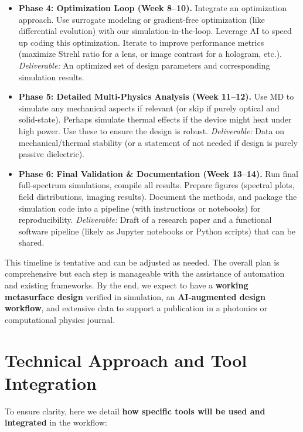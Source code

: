 \documentclass[11pt]{article}
\begin{document}
\begin{itemize}
\begin{itemize}[leftmargin=2em]
    \item \textbf{Phase 4: Optimization Loop (Week 8--10).} Integrate an optimization approach. Use surrogate modeling or gradient-free optimization (like differential evolution) with our simulation-in-the-loop. Leverage AI to speed up coding this optimization. Iterate to improve performance metrics (maximize Strehl ratio for a lens, or image contrast for a hologram, etc.). \emph{Deliverable:} An optimized set of design parameters and corresponding simulation results.
    \item \textbf{Phase 5: Detailed Multi-Physics Analysis (Week 11--12).} Use MD to simulate any mechanical aspects if relevant (or skip if purely optical and solid-state). Perhaps simulate thermal effects if the device might heat under high power. Use these to ensure the design is robust. \emph{Deliverable:} Data on mechanical/thermal stability (or a statement of not needed if design is purely passive dielectric).
    \item \textbf{Phase 6: Final Validation \& Documentation (Week 13--14).} Run final full-spectrum simulations, compile all results. Prepare figures (spectral plots, field distributions, imaging results). Document the methods, and package the simulation code into a pipeline (with instructions or notebooks) for reproducibility. \emph{Deliverable:} Draft of a research paper and a functional software pipeline (likely as Jupyter notebooks or Python scripts) that can be shared.
  \end{itemize}
\end{itemize}

This timeline is tentative and can be adjusted as needed. The overall plan is comprehensive but each step is manageable with the assistance of automation and existing frameworks. By the end, we expect to have a \textbf{working metasurface design} verified in simulation, an \textbf{AI-augmented design workflow}, and extensive data to support a publication in a photonics or computational physics journal.

\section{Technical Approach and Tool Integration}

To ensure clarity, here we detail \textbf{how specific tools will be used and integrated} in the workflow:
\end{document}
